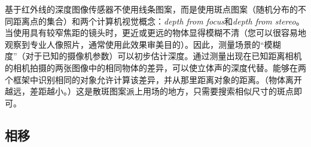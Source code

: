 基于红外线的深度图像传感器不使用线条图案，而是使用斑点图案（随机分布的不同距离点的集合）和两个计算机视觉概念：\emph{depth from focus}和\emph{depth from stereo}。当使用具有较窄焦距的镜头时，更近或更远的物体显得模糊不清（您可以很容易地观察到专业人像照片，通常使用此效果审美目的）。因此，测量场景的“模糊度”（对于已知的摄像机参数）可以初步估计深度。通过测量出现在已知距离相机的相机拍摄的两张图像中的相同物体的差异，可以使立体声的深度代替。能够在两个框架中识别相同的对象允许计算该差异，并从那里距离对象的距离。（物体离开越远，差距越小。）这是散斑图案派上用场的地方，只需要搜索相似尺寸的斑点即可。


\subsection{相移}
\label{sec:phaseshiftsensors}


